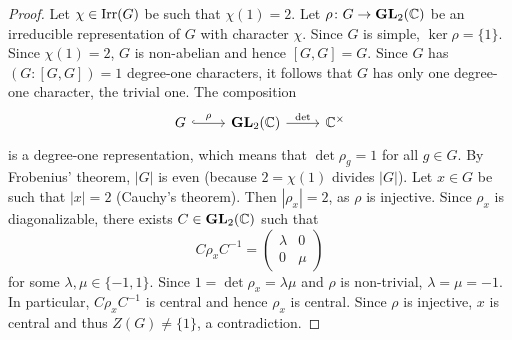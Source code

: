 \begin{proof}
    Let $\chi\in\operatorname{Irr}(G)$ be such that $\chi(1)=2$. Let $\rho\colon G\to\mathbf{GL}_2(\mathbb{C})$
    be an irreducible representation of $G$ with character $\chi$. Since 
    $G$ is simple, $\ker\rho=\{1\}$. Since $\chi(1)=2$, 
    $G$ is non-abelian and hence $[G,G]=G$. Since 
    $G$ has $(G:[G,G])=1$ degree-one characters, it follows that
    $G$ has only one degree-one character, the trivial one. The composition
    \[
    \begin{tikzcd}
    	G & {\GL_2(\C)} & {\C^{\times}}
    	\arrow["{\rho }", hook, from=1-1, to=1-2]
    	\arrow["{\det }", from=1-2, to=1-3]
    \end{tikzcd}
    \]
    is a degree-one representation, which means that $\det\rho_g=1$ for all $g\in G$. 
    By Frobenius' theorem, $|G|$ is even (because 
    $2=\chi(1)$ divides $|G|$). Let $x\in G$ be such that $|x|=2$ (Cauchy's theorem). 
    Then $|\rho_x|=2$, as $\rho$ is injective. Since $\rho_x$ is diagonalizable, 
    there exists $C\in\mathbf{GL}_2(\mathbb{C})$ such that
    \[
    C\rho_xC^{-1}=\begin{pmatrix}
    \lambda&0\\
    0&\mu
    \end{pmatrix}
    \]
    for some $\lambda,\mu\in\{-1,1\}$. Since $1=\det\rho_x=\lambda\mu$ and
    $\rho$ is non-trivial, $\lambda=\mu=-1$. In particular, $C\rho_xC^{-1}$ is central
    and hence $\rho_x$ is central. Since $\rho$ is injective, $x$ is central 
    and thus $Z(G)\ne\{1\}$, a contradiction. 
\end{proof}